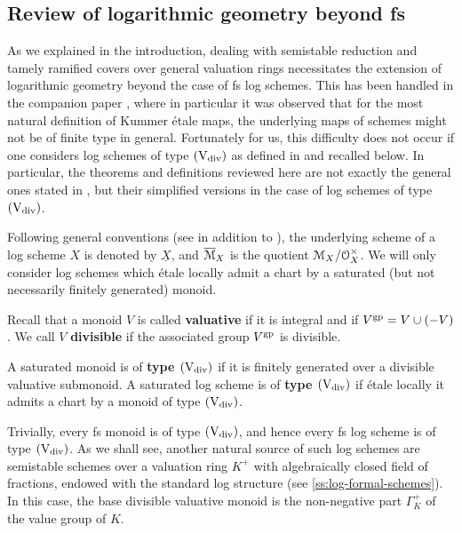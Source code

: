 \subsection{Review of logarithmic geometry beyond fs} 
\label{ss:log-review}

As we explained in the introduction, dealing with semistable reduction and tamely ramified covers over general valuation rings necessitates the extension of logarithmic geometry beyond the case of fs log schemes. This has been handled in the companion paper \cite{AHLS-Log}, where in particular it was observed that for the most natural definition of Kummer \'etale maps, the underlying maps of schemes might not be of finite type in general. Fortunately for us, this difficulty does not occur if one considers log schemes of type $(\mathrm{V}_{\rm div})$ as defined in \cite[\S 5]{AHLS-Log} and recalled below. In particular, the theorems and definitions reviewed here are not exactly the general ones stated in \cite{AHLS-Log}, but their simplified versions in the case of log schemes of type $(\mathrm{V}_{\rm div})$.

Following general conventions (see \cite{Kato1989:LogarithmicStructures,Ogus,KatoToricSingularities} in addition to \cite{AHLS-Log}), the underlying scheme of a log scheme $X$ is denoted by $\underline{X}$, and $\overline{{\mathcal M}}_{X}$ is the quotient ${\mathcal M}_X/{\mathcal O}_X^\times$. We will only consider log schemes which \'etale locally admit a chart by a saturated (but not necessarily finitely generated) monoid.  

Recall that a monoid $V$ is called {\bf valuative} if it is integral and if $V^{\rm gp} = V \cup (-V)$. We call $V$ {\bf divisible} if the associated group $V^{\rm gp}$ is divisible. 

\begin{defi} \label{def:log-sch-type-Vd}
    A saturated monoid is of {\bf type $(\mathrm{V}_{\rm div})$} if it is finitely generated over a divisible valuative submonoid. A saturated log scheme is of {\bf type $(\mathrm{V}_{\rm div})$} if \'etale locally it admits a chart by a monoid of type $(\mathrm{V}_{\rm div})$.
\end{defi}

Trivially, every fs monoid is of type $(\mathrm{V}_{\rm div})$, and hence every fs log scheme is of type $(\mathrm{V}_{\rm div})$. As we shall see, another natural source of such log schemes are semistable schemes over a valuation ring $K^+$ with algebraically closed field of fractions, endowed with the standard log structure (see \cref{ss:log-formal-schemes}). In this case, the base divisible valuative monoid is the non-negative part $\Gamma_K^+$ of the value group of $K$.

